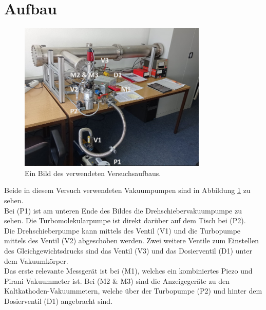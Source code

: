 \section{Aufbau}
		
	\begin{figure}
		\centering
		\includegraphics[width=0.8\textwidth]{"latex/images/Aufbau_beschriftet.png"}
		\caption{Ein Bild des verwendeten Versuchsaufbaus.}
		\label{fig:auf}
	\end{figure}		
	\noindent
	Beide in diesem Versuch verwendeten Vakuumpumpen sind in Abbildung \ref{fig:auf} zu sehen.\\
	Bei (P1) ist am unteren Ende des Bildes die Drehschiebervakuumpumpe zu sehen. 
	Die Turbomolekularpumpe ist direkt darüber auf dem Tisch bei (P2).\\
	Die Drehschieberpumpe kann mittels des Ventil (V1) und die Turbopumpe mittels des Ventil (V2) abgeschoben werden.
	Zwei weitere Ventile zum Einstellen des Gleichgewichtsdrucks sind das Ventil (V3) und das Dosierventil (D1) unter dem Vakuumkörper.\\
	Das erste relevante Messgerät ist bei (M1), welches ein kombiniertes Piezo und Pirani Vakuummeter ist.
	Bei (M2 \& M3) sind die Anzeigegeräte zu den Kaltkathoden-Vakuummetern, welche über der Turbopumpe (P2) und hinter dem Dosierventil (D1) angebracht sind.

